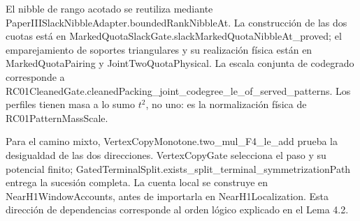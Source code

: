 \documentclass[spanish,11pt,a4paper]{article}
\begin{document}
El nibble de rango acotado se reutiliza mediante {\ttfamily\small PaperIIISlac\discretionary{\hbox{\ensuremath{\hookrightarrow}}}{}{}kNibbleAdapt\discretionary{\hbox{\ensuremath{\hookrightarrow}}}{}{}er.\discretionary{\hbox{\ensuremath{\hookrightarrow}}}{}{}boundedRankN\discretionary{\hbox{\ensuremath{\hookrightarrow}}}{}{}ibbleAt}. La construcción de las dos cuotas está en {\ttfamily\small MarkedQuotaS\discretionary{\hbox{\ensuremath{\hookrightarrow}}}{}{}lackGate.\discretionary{\hbox{\ensuremath{\hookrightarrow}}}{}{}slackMarkedQ\discretionary{\hbox{\ensuremath{\hookrightarrow}}}{}{}uotaNibbleAt\discretionary{\hbox{\ensuremath{\hookrightarrow}}}{}{}\_\discretionary{\hbox{\ensuremath{\hookrightarrow}}}{}{}proved}; el emparejamiento de soportes triangulares y su realización física están en {\ttfamily\small MarkedQuotaP\discretionary{\hbox{\ensuremath{\hookrightarrow}}}{}{}airing} y {\ttfamily\small JointTwoQuot\discretionary{\hbox{\ensuremath{\hookrightarrow}}}{}{}aPhysical}. La escala conjunta de codegrado corresponde a {\ttfamily\small RC01CleanedG\discretionary{\hbox{\ensuremath{\hookrightarrow}}}{}{}ate.\discretionary{\hbox{\ensuremath{\hookrightarrow}}}{}{}cleanedPacki\discretionary{\hbox{\ensuremath{\hookrightarrow}}}{}{}ng\_\discretionary{\hbox{\ensuremath{\hookrightarrow}}}{}{}joint\_\discretionary{\hbox{\ensuremath{\hookrightarrow}}}{}{}codegree\_\discretionary{\hbox{\ensuremath{\hookrightarrow}}}{}{}le\_\discretionary{\hbox{\ensuremath{\hookrightarrow}}}{}{}of\_\discretionary{\hbox{\ensuremath{\hookrightarrow}}}{}{}served\_\discretionary{\hbox{\ensuremath{\hookrightarrow}}}{}{}patterns}. Los perfiles tienen masa a lo sumo \(t^2\), no uno: es la normalización física de {\ttfamily\small RC01PatternM\discretionary{\hbox{\ensuremath{\hookrightarrow}}}{}{}assScale}.

Para el camino mixto, {\ttfamily\small VertexCopyMo\discretionary{\hbox{\ensuremath{\hookrightarrow}}}{}{}notone.\discretionary{\hbox{\ensuremath{\hookrightarrow}}}{}{}two\_\discretionary{\hbox{\ensuremath{\hookrightarrow}}}{}{}mul\_\discretionary{\hbox{\ensuremath{\hookrightarrow}}}{}{}F4\_\discretionary{\hbox{\ensuremath{\hookrightarrow}}}{}{}le\_\discretionary{\hbox{\ensuremath{\hookrightarrow}}}{}{}add} prueba la desigualdad de las dos direcciones. {\ttfamily\small VertexCopyGa\discretionary{\hbox{\ensuremath{\hookrightarrow}}}{}{}te} selecciona el paso y su potencial finito; {\ttfamily\small GatedTermina\discretionary{\hbox{\ensuremath{\hookrightarrow}}}{}{}lSplit.\discretionary{\hbox{\ensuremath{\hookrightarrow}}}{}{}exists\_\discretionary{\hbox{\ensuremath{\hookrightarrow}}}{}{}split\_\discretionary{\hbox{\ensuremath{\hookrightarrow}}}{}{}terminal\_\discretionary{\hbox{\ensuremath{\hookrightarrow}}}{}{}symmetrizati\discretionary{\hbox{\ensuremath{\hookrightarrow}}}{}{}onPath} entrega la sucesión completa. La cuenta local se construye en {\ttfamily\small NearH1Window\discretionary{\hbox{\ensuremath{\hookrightarrow}}}{}{}Accounts}, antes de importarla en {\ttfamily\small NearH1Locali\discretionary{\hbox{\ensuremath{\hookrightarrow}}}{}{}zation}. Esta dirección de dependencias corresponde al orden lógico explicado en el Lema 4.2.
\end{document}
